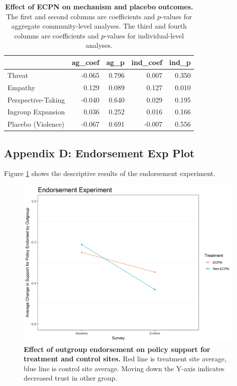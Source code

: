 \documentclass[11pt]{article}
\begin{document}
\begin{table}[H]
\begin{center}

\begin{tabular}{l|r|r|r|r}
\hline
  & ag\_coef & ag\_p & ind\_coef & ind\_p\\
\hline
Threat & -0.065 & 0.796 & 0.007 & 0.350\\
\hline
Empathy & 0.129 & 0.089 & 0.127 & 0.010\\
\hline
Perspective-Taking & -0.040 & 0.640 & 0.029 & 0.195\\
\hline
Ingroup Expansion & 0.036 & 0.252 & 0.016 & 0.166\\
\hline
Placebo (Violence) & -0.067 & 0.691 & -0.007 & 0.556\\
\hline
\end{tabular}


\caption{\label{tab:mech_ind_tab}\textbf{Effect of ECPN on mechanism and placebo outcomes.} The first and second columns are coefficients and $p$-values for aggregate community-level analyses.  The third and fourth columns are coefficients and $p$-values for individual-level analyses.}
\end{center}
\end{table}

\hypertarget{appendix-d-endorsement-exp-plot}{%
\subsection{Appendix D: Endorsement Exp
Plot}\label{appendix-d-endorsement-exp-plot}}

Figure \ref{fig:end1} shows the descriptive results of the endorsement
experiment.

\begin{figure}[H]
\centering
\includegraphics[width=.7\textwidth]{../../../figs/endComm_plot.png}
\caption{\label{fig:end1} \textbf{Effect of outgroup endorsement on policy support for treatment and control sites.} Red line is treatment site average, blue line is control site average.  Moving down the Y-axis indicates decreased trust in other group.}
\end{figure}
\end{document}
